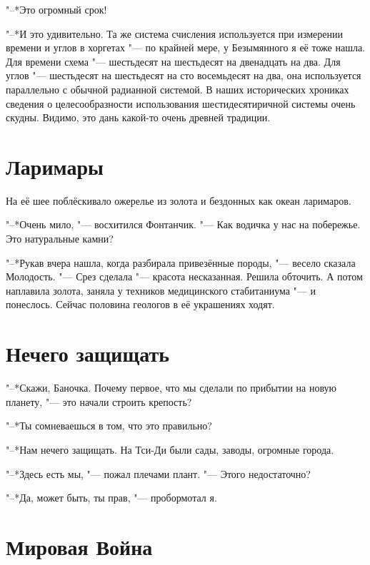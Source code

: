 "--*Это огромный срок!

"--*И это удивительно.
Та же система счисления используется при измерении времени и углов в хоргетах "--- по крайней мере, у Безымянного я её тоже нашла.
Для времени схема "--- шестьдесят на шестьдесят на двенадцать на два.
Для углов "--- шестьдесят на шестьдесят на сто восемьдесят на два, она используется параллельно с обычной радианной системой.
В наших исторических хрониках сведения о целесообразности использования шестидесятиричной системы очень скудны.
Видимо, это дань какой-то очень древней традиции.

\section{Ларимары}

На её шее поблёскивало ожерелье из золота и бездонных как океан ларимаров.

"--*Очень мило, "--- восхитился Фонтанчик.
"--- Как водичка у нас на побережье.
Это натуральные камни?

"--*Рукав вчера нашла, когда разбирала привезённые породы, "--- весело сказала Молодость.
"--- Срез сделала "--- красота несказанная.
Решила обточить.
А потом наплавила золота, заняла у техников медицинского стабитаниума "--- и понеслось.
Сейчас половина геологов в её украшениях ходят.

\section{Нечего защищать}

"--*Скажи, Баночка.
Почему первое, что мы сделали по прибытии на новую планету, "--- это начали строить крепость?

"--*Ты сомневаешься в том, что это правильно?

"--*Нам нечего защищать.
На Тси-Ди были сады, заводы, огромные города.

"--*Здесь есть мы, "--- пожал плечами плант.
"--- Этого недостаточно?

"--*Да, может быть, ты прав, "--- пробормотал я.

\section{Мировая Война}

